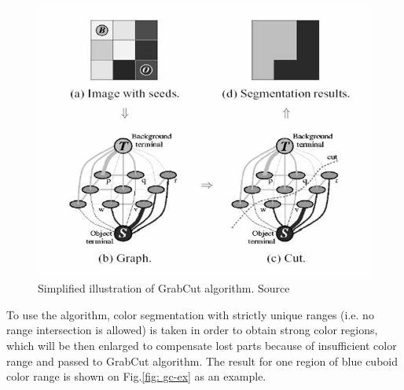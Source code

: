 \documentclass{ctuthesis}
\begin{document}
\begin{figure}[htbp]
    \centering
    \includegraphics[width=\textwidth]{grabcut.jpg}
    \caption{Simplified illustration of GrabCut algorithm. Source \cite{grabcut_pic}}
    \label{fig:GrabCut}
\end{figure}

To use the algorithm, color segmentation with strictly unique ranges (i.e. no range intersection is allowed) is taken in order to obtain strong color regions, which will be then enlarged to compensate lost parts because of insufficient color range and passed to GrabCut algorithm. The result for one region of blue cuboid color range is shown on Fig.\ref{fig: gc-ex} as an example.
\end{document}
